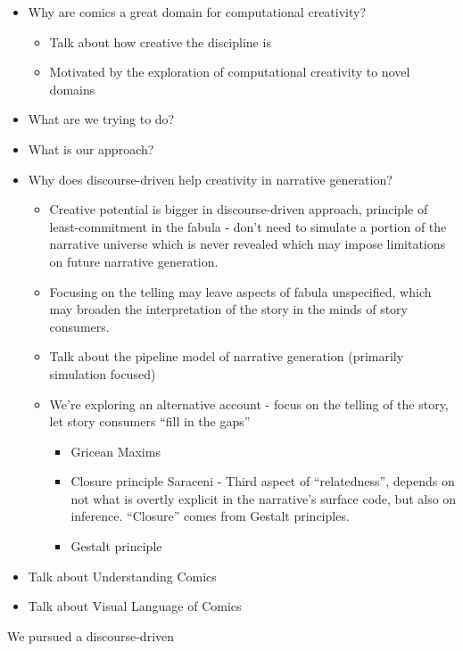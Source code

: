 % 
% 
% 
% 
% 
% 
% 
% 
% 
% 
% 
% 
% 
\begin{itemize} \item Why are comics a great domain for computational
creativity? \begin{itemize} \item Talk about how creative the discipline is
\item Motivated by the exploration of computational creativity to novel domains
\end{itemize} \item What are we trying to do? \item What is our approach? \item
Why does discourse-driven help creativity in narrative generation?
\begin{itemize} \item Creative potential is bigger in discourse-driven approach,
principle of least-commitment in the fabula - don't need to simulate a portion
of the narrative universe which is never revealed which may impose limitations
on future narrative generation. 

			\item Focusing on the telling may leave aspects of fabula
			unspecified, which may broaden the interpretation of the story in
			the minds of story consumers.  \item Talk about
			the pipeline model of narrative generation (primarily simulation
			focused) \item We're exploring an alternative account - focus on the
			telling of the story, let story consumers ``fill in the gaps''

			\begin{itemize} \item Gricean Maxims \item Closure principle
			Saraceni - Third aspect of ``relatedness'', depends on not what is
			overtly explicit in the narrative's surface code, but also on
			inference.  ``Closure'' comes from Gestalt principles. \item Gestalt
			principle \end{itemize} \end{itemize}


	\item Talk about Understanding Comics~\cite{mcCloud1993understanding} \item
	Talk about Visual Language of Comics~\cite{cohn2013visual} \end{itemize}

We pursued a discourse-driven

